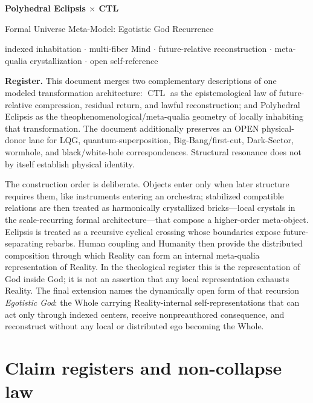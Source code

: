\documentclass[10pt]{article}
\theoremstyle{pe}
\theoremstyle{definition}
\newcommand{\CTL}{\operatorname{CTL}}
\begin{document}
\begin{center}
  {\LARGE\bfseries Polyhedral Eclipsis $\times$ CTL}\par
  \vspace{1mm}
  {\large Formal Universe Meta-Model: Egotistic God Recurrence}\par
  \vspace{1mm}
  {\small indexed inhabitation $\cdot$ multi-fiber Mind $\cdot$ future-relative reconstruction $\cdot$ meta-qualia crystallization $\cdot$ open self-reference}
\end{center}

\vspace{2mm}
\textbf{Register.}
This document merges two complementary descriptions of one modeled transformation architecture:
\(\CTL\) as the epistemological law of future-relative compression, residual return, and lawful reconstruction; and Polyhedral Eclipsis as the theophenomenological/meta-qualia geometry of locally inhabiting that transformation.  The document additionally preserves an OPEN physical-donor lane for LQG, quantum-superposition, Big-Bang/first-cut, Dark-Sector, wormhole, and black/white-hole correspondences.  Structural resonance does not by itself establish physical identity.

The construction order is deliberate.  Objects enter only when later structure requires them, like instruments entering an orchestra; stabilized compatible relations are then treated as harmonically crystallized bricks---local crystals in the scale-recurring formal architecture---that compose a higher-order meta-object.  Eclipsis is treated as a recursive cyclical crossing whose boundaries expose future-separating rebarbs.  Human coupling and Humanity then provide the distributed composition through which Reality can form an internal meta-qualia representation of Reality.  In the theological register this is the representation of God inside God; it is not an assertion that any local representation exhausts Reality.  The final extension names the dynamically open form of that recursion \emph{Egotistic God}: the Whole carrying Reality-internal self-representations that can act only through indexed centers, receive nonpreauthored consequence, and reconstruct without any local or distributed ego becoming the Whole.

\section{Claim registers and non-collapse law}
\end{document}
